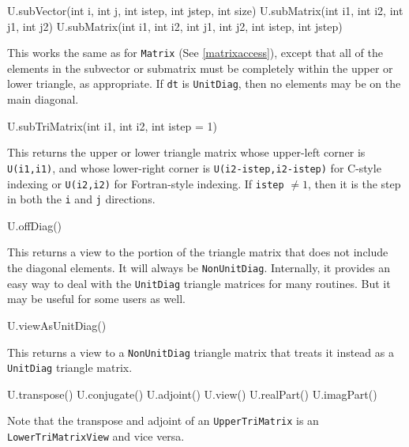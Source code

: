 \documentclass[twoside,letterpaper,11pt]{article}
\renewcommand{\tt}[1]{{\lstinline {#1}}}
\begin{document}
\begin{tmvcode}
U.subVector(int i, int j, int istep, int jstep, int size)
U.subMatrix(int i1, int i2, int j1, int j2)
U.subMatrix(int i1, int i2, int j1, int j2, int istep, int jstep)
\end{tmvcode}
This works the same as for \tt{Matrix}
(See \ref{matrixaccess}),
except that all of the elements in the 
subvector or submatrix must be completely within the upper or lower triangle, as
appropriate.  If \tt{dt} is \tt{UnitDiag}, then no elements may be on the 
main diagonal.

\begin{tmvcode}
U.subTriMatrix(int i1, int i2, int istep = 1)
\end{tmvcode}
This returns the upper or lower triangle matrix whose upper-left
corner is \tt{U(i1,i1)}, and whose lower-right corner is 
\tt{U(i2-istep,i2-istep)} for C-style indexing or \tt{U(i2,i2)} 
for Fortran-style indexing.  If \tt{istep} $\neq 1$, then it is the 
step in both the \tt{i} and \tt{j} directions.

\begin{tmvcode}
U.offDiag()
\end{tmvcode}
This returns a view to the portion of the triangle matrix that does not include
the diagonal elements.  It will always be \tt{NonUnitDiag}.
Internally, it provides an easy way to deal with the \tt{UnitDiag} triangle matrices
for many routines.  But it may be useful for some users as well.

\begin{tmvcode}
U.viewAsUnitDiag()
\end{tmvcode}
This returns a view to a \tt{NonUnitDiag} triangle matrix that treats it
instead as a \tt{UnitDiag} triangle matrix.

\begin{tmvcode}
U.transpose()
U.conjugate()
U.adjoint()
U.view()
U.realPart()
U.imagPart()
\end{tmvcode}
Note that the transpose and adjoint of an \tt{UpperTriMatrix} is an
\tt{LowerTriMatrixView} and vice versa.
\vspace{12pt}
\end{document}
